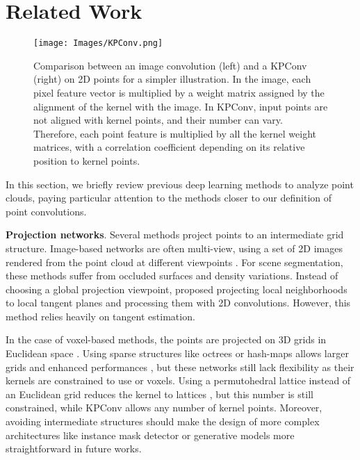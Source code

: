 \documentclass[10pt,twocolumn,letterpaper]{article}
\begin{document}
\section{Related Work}

\begin{figure*}[t!]
    \vspace{-4ex}
    \centering
    \texttt{[image: Images/KPConv.png]}
    \caption{Comparison between an image convolution (left) and a KPConv (right) on 2D points for a simpler illustration. In the image, each pixel feature vector is multiplied by a weight matrix  assigned by the alignment of the kernel with the image. In KPConv, input points are not aligned with kernel points, and their number can vary. Therefore, each point feature  is multiplied by all the kernel weight matrices, with a correlation coefficient  depending on its relative position to kernel points.}
    \label{fig_KPConv}
    \vspace{-2ex}
\end{figure*}

In this section, we briefly review previous deep learning methods to analyze point clouds, paying particular attention to the methods closer to our definition of point convolutions.

\noindent
\textbf{Projection networks}. Several methods project points to an intermediate grid structure. Image-based networks are often multi-view, using a set of 2D images rendered from the point cloud at different viewpoints \cite{su2015multi, boulch2017unstructured, lawin2017deep}. For scene segmentation, these methods suffer from occluded surfaces and density variations. Instead of choosing a global projection viewpoint,  \cite{tatarchenko2018tangent} proposed projecting local neighborhoods to local tangent planes and processing them with 2D convolutions. However, this method  relies heavily on tangent estimation.

In the case of voxel-based methods, the points are projected on 3D grids in Euclidean space \cite{maturana2015voxnet, roynard2018classification, ben20183dmfv}. Using sparse structures like octrees or hash-maps allows larger grids and enhanced performances \cite{riegler2017octnet, graham20183d}, but these networks still lack flexibility as their kernels are constrained to use  or  voxels. Using a permutohedral lattice instead of an Euclidean grid reduces the kernel to  lattices \cite{su2018splatnet}, but this number is still constrained, while KPConv allows any number of kernel points. Moreover, avoiding intermediate structures should make the design of more complex architectures like instance mask detector or generative models more straightforward in future works.
\end{document}
